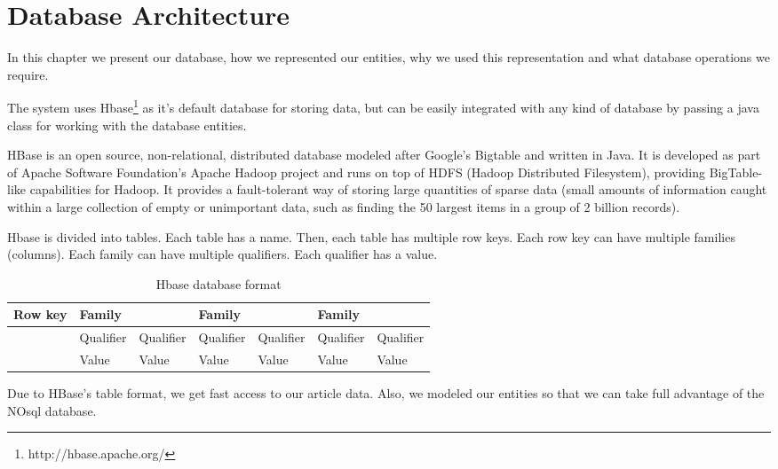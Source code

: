 \chapter{Database Architecture}
\label{chapter:database-architecture}
In this chapter we present our database, how we represented our entities, why we used this representation and what database operations we require.

The system uses Hbase\footnote{http://hbase.apache.org/} as it’s default database for storing data, but can be easily integrated with any kind of database by passing a java class for working with the database entities.

HBase is an open source, non-relational, distributed database modeled after Google's Bigtable\cite{google-big-table} and written in Java. It is developed as part of Apache Software Foundation's Apache Hadoop project and runs on top of HDFS (Hadoop Distributed Filesystem), providing BigTable-like capabilities for Hadoop. It provides a fault-tolerant way of storing large quantities of sparse data (small amounts of information caught within a large collection of empty or unimportant data, such as finding the 50 largest items in a group of 2 billion records).

Hbase is divided into tables. Each table has a name. Then, each table has multiple row keys. Each row key can have multiple families (columns). Each family can have multiple qualifiers. Each qualifier has a value.

\begin{table}[h]
  \caption{Hbase database format}
\centering
\begin{tabular}{@{}lllllll@{}}

Row key                & Family                         &                                & Family                         &                                & Family    &           \\ \toprule 
& Qualifier                      & Qualifier                      & Qualifier                      & Qualifier                      & Qualifier & Qualifier \\ 
                       & Value                          & Value                          & Value                          & Value                          & Value     & Value     
\end{tabular}
\end{table}

Due to HBase's table format, we get fast access to our article data. Also, we modeled our entities so that we can take full advantage of the NOsql database.

